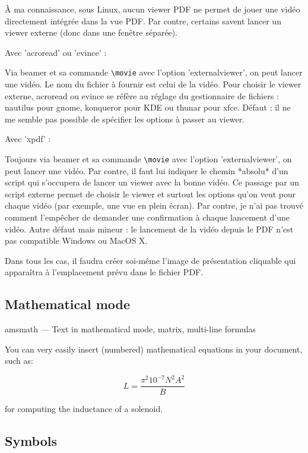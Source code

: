 \documentclass{boostreport}
\begin{document}
À ma connaissance, sous Linux, aucun viewer PDF ne permet de jouer une vidéo
directement intégrée dans la vue PDF. Par contre, certains savent lancer un
viewer externe (donc dans une fenêtre séparée).

Avec 'acroread' ou 'evince' :

Via beamer et sa commande \verb|\movie| avec l'option 'externalviewer', on
peut lancer une vidéo. Le nom du fichier à fournir est celui de la vidéo.
Pour choisir le viewer externe, acroread ou evince se réfère au réglage du
gestionnaire de fichiers : nautilus pour gnome, konqueror pour KDE ou thunar
pour xfce. Défaut : il ne me semble pas possible de spécifier les options à
passer au viewer.

Avec 'xpdf' :

Toujours via beamer et sa commande \verb|\movie| avec l'option
'externalviewer', on peut lancer une vidéo. Par contre, il faut lui indiquer
le chemin *absolu* d'un script qui s'occupera de lancer un viewer avec la
bonne vidéo. Ce passage par un script externe permet de choisir le viewer et
surtout les options qu'on veut pour chaque vidéo (par exemple, une vue en
plein écran). Par contre, je n'ai pas trouvé comment l'empêcher de demander
une confirmation à chaque lancement d'une vidéo. Autre défaut mais mineur :
le lancement de la vidéo depuis le PDF n'est pas compatible Windows ou MacOS
X.

Dans tous les cas, il faudra créer soi-même l'image de présentation
cliquable qui apparaîtra à l'emplacement prévu dans le fichier PDF.


\subsection{Mathematical mode}
\label{sec:mathematical-mode}

amsmath --- Text in mathematical mode, matrix, multi-line formulas

You can very easily insert (numbered) mathematical equations in your
document, such as:

\begin{equation}
    \label{eq:1}
    L = \frac{\pi^2 10^{-7} N^2 A^2}{B}
\end{equation}

for computing the inductance of a solenoid.

\subsection{Symbols}
\label{sec:symbols}
\end{document}
